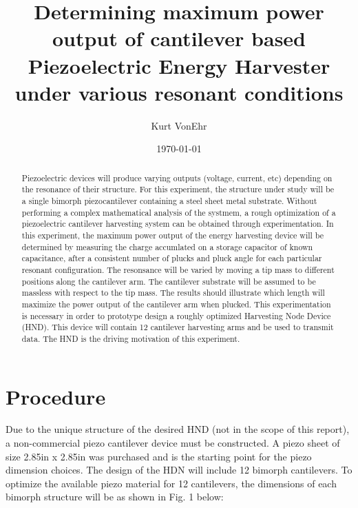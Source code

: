 \documentclass[aps,prl,twocolumn,groupedaddress]{revtex4}
\begin{document}
\title{Determining maximum power output of cantilever based Piezoelectric Energy Harvester under various resonant conditions}

\author{Kurt VonEhr}

\date{\today}

\begin{abstract}
Piezoelectric devices will produce varying outputs (voltage, current, etc) depending on the resonance of their structure. For this experiment, the structure under study will be a single bimorph piezocantilever containing a steel sheet metal substrate. Without performing a complex mathematical analysis of the systmem, a rough optimization of a piezoelectric cantilever harvesting system can be obtained through experimentation. In this experiment, the maximum power output of the energy harvesting device will be determined by measuring the charge accumlated on a storage capacitor of known capacitance, after a consistent number of plucks and pluck angle for each particular resonant configuration. The resonsance will be varied by moving a tip mass to different positions along the cantilever arm. The cantilever substrate will be assumed to be massless with respect to the tip mass. The results should illustrate which length will maximize the power output of the cantilever arm when plucked. This experimentation is necessary in order to prototype design a roughly optimized Harvesting Node Device (HND). This device will contain 12 cantilever harvesting arms and be used to transmit data. The HND is the driving motivation of this experiment. 
\end{abstract}

\maketitle

\section{Procedure}

Due to the unique structure of the desired HND (not in the scope of this report), a non-commercial piezo cantilever device must be constructed. A piezo sheet of size 2.85in x 2.85in was purchased and is the starting point for the piezo dimension choices. The design of the HDN will include 12 bimorph cantilevers. To optimize the available piezo material for 12 cantilevers,  the dimensions of each bimorph structure will be as shown in Fig. 1 below:
\end{document}
